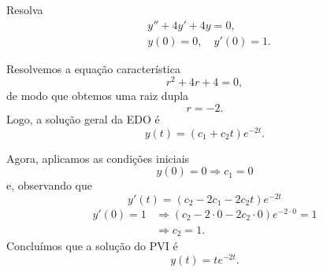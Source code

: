 \begin{exeresol}
  Resolva
  \begin{align}
    &y'' + 4y' + 4y = 0,\\
    &y(0) = 0,\quad y'(0)=1.    
  \end{align}
\end{exeresol}
\begin{resol}
  Resolvemos a equação característica
  \begin{equation}
    r^2 + 4r + 4 = 0,
  \end{equation}
  de modo que obtemos uma raiz dupla
  \begin{equation}
    r = -2.
  \end{equation}
  Logo, a solução geral da EDO é
  \begin{equation}
    y(t) = (c_1 + c_2t)e^{-2t}.
  \end{equation}

  Agora, aplicamos as condições iniciais
  \begin{equation}
    y(0) = 0 \Rightarrow c_1 = 0
  \end{equation}
  e, observando que
  \begin{equation}
    y'(t) = (c_2-2c_1-2c_2t)e^{-2t}
  \end{equation}
  \begin{align}
    y'(0) = 1 &\Rightarrow (c_2-2\cdot 0-2c_2\cdot 0)e^{-2\cdot 0} = 1 \\
              &\Rightarrow c_2 = 1.
  \end{align}
  Concluímos que a solução do PVI é
  \begin{equation}
    y(t) = te^{-2t}.
  \end{equation}
\end{resol}

